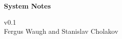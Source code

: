 \documentclass[11pt,a4paper]{report}
\begin{document}
\begin{titlepage}
    \vspace*{3cm}
    \begin{flushleft}
        \Huge{\bfseries{System Notes}}
    \end{flushleft}
    \vfill
    \begin{flushright}
        v0.1\\
        Fergus Waugh and Stanislav Cholakov
    \end{flushright}
\end{titlepage}

\tableofcontents














\end{document}
